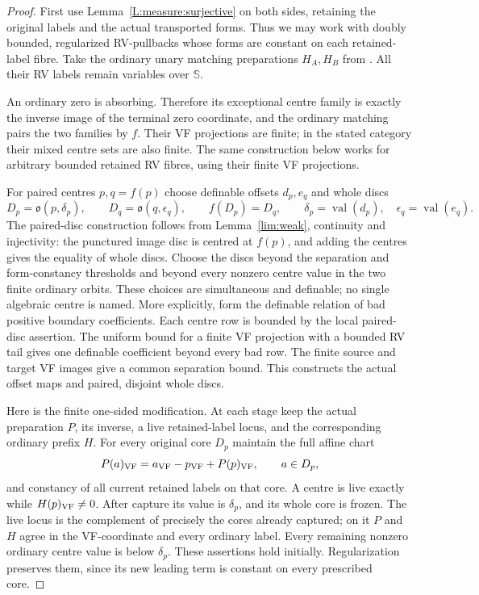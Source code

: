 \documentclass[12pt]{amsart}
\theoremstyle{plain}
\theoremstyle{definition}
\theoremstyle{remark}
\numberwithin{equation}{section}
\theoremstyle{plain}
\newcommand{\VF}{\textup{VF}}
\newcommand{\go}{\mathfrak{o}}
\newcommand{\0}{\emptyset}
\DeclareMathOperator{\vv}{val}
\begin{document}
\begin{proof}
First use Lemma~\ref{L:measure:surjective} on both sides, retaining the
original labels and the actual transported forms. Thus we may work
with doubly bounded, regularized RV-pullbacks whose forms are constant
on each retained-label fibre. Take the ordinary unary matching
preparations $H_A,H_B$ from \cite[Lemma~5.2]{Yin:int:acvf}. All their
RV labels remain variables over $\mathbb S$.

An ordinary zero is absorbing. Therefore its exceptional centre family
is exactly the inverse image of the terminal zero coordinate, and the
ordinary matching pairs the two families by $f$. Their VF projections
are finite; in the stated category their mixed centre sets are also
finite. The same construction below works for arbitrary bounded
retained RV fibres, using their finite VF projections.

For paired centres $p,q=f(p)$ choose definable offsets
$d_p,e_q$ and whole discs
\[
 D_p=\go(p,\delta_p),\qquad D_q=\go(q,\epsilon_q),\qquad
 f(D_p)=D_q,\qquad \delta_p=\vv(d_p),\quad\epsilon_q=\vv(e_q).
\]
The paired-disc construction follows from Lemma~\ref{lim:weak},
continuity and injectivity: the punctured image disc is centred at
$f(p)$, and adding the centres gives the equality of whole discs.
Choose the discs beyond the separation and form-constancy thresholds
and beyond every nonzero centre value in the two finite ordinary
orbits. These choices are simultaneous and definable; no single
algebraic centre is named. More explicitly, form the definable
relation of bad positive boundary coefficients. Each centre row is
bounded by the local paired-disc assertion. The uniform bound for a
finite VF projection with a bounded RV tail gives one
definable coefficient beyond every bad row. The finite source and target
VF images give a common separation bound. This constructs the actual
offset maps and paired, disjoint whole discs.

Here is the finite one-sided modification. At each stage keep the
actual preparation $P$, its inverse, a live retained-label locus, and
the corresponding ordinary prefix $H$. For every original core $D_p$
maintain the full affine chart
\[
 P(a)_{\VF}=a_{\VF}-p_{\VF}+P(p)_{\VF},\qquad a\in D_p,
\]
and constancy of all current retained labels on that core. A centre
is live exactly while $H(p)_{\VF}\ne0$. After capture its value is
$\delta_p$, and its whole core is frozen. The live locus is the
complement of precisely the cores already captured; on it $P$ and
$H$ agree in the VF-coordinate and every ordinary label. Every
remaining nonzero ordinary centre value is below $\delta_p$.
These assertions hold initially. Regularization preserves them,
since its new leading term is constant on every prescribed core.


\end{proof}
\end{document}

